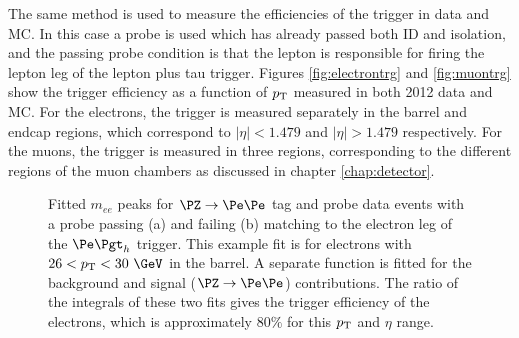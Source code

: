 The same method is used to measure the efficiencies of the trigger
in data and MC. In this case a probe is used which has already passed both ID
and isolation, and the passing probe condition is that the lepton is responsible
for firing the lepton leg of the lepton plus tau trigger. Figures
\ref{fig:electrontrg} and \ref{fig:muontrg} show the trigger efficiency as a
function of $p_{\mathrm{T}}$ measured in both 2012 data and \ac{MC}. For the
electrons, the trigger is measured separately in the barrel and endcap
regions, which correspond to $|\eta| < 1.479$ and $|\eta| > 1.479$
respectively. For the muons, the trigger is measured in three regions, corresponding
to the different regions of the muon chambers as discussed in chapter
\ref{chap:detector}.

\begin{figure}[htb]
\caption{Fitted $m_{ee}$ peaks for $\PZ\to\Pe\Pe$ tag and probe data events with a probe passing (a) and
failing (b) matching to the electron leg of the $\etau$ trigger. This example
fit is for electrons with $26 <\pt< 30~\GeV$ in the barrel. A separate function is fitted for the
background and signal ($\PZ\to\Pe\Pe$) contributions. The ratio of the integrals
of these two fits gives the trigger efficiency of the electrons, which is
approximately $80\%$ for this $p_{\mathrm{T}}$ and $\eta$ range.}
\label{fig:tandp}
\end{figure}


